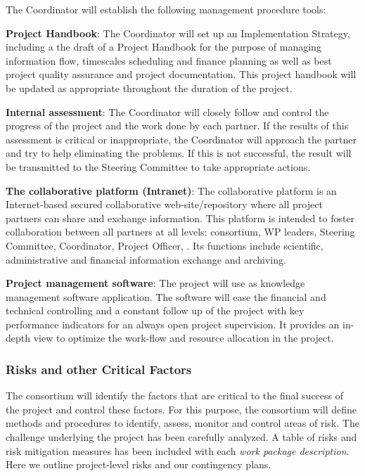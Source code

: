 The Coordinator will establish the following
management procedure tools:
\begin{denseItemize}

\item {\bf Project Handbook}: The Coordinator will set up an
  Implementation Strategy, including a the draft of a Project Handbook
  for the purpose of managing information flow, timescales scheduling
  and finance planning as well as best project quality assurance and
  project documentation. This project handbook will be updated as
  appropriate throughout the duration of the project.

\item {\bf Internal assessment}: The Coordinator will
  closely follow and control the progress of the project and the work
  done by each partner.  If the results of this assessment is critical
  or inappropriate, the Coordinator will approach the partner and try
  to help eliminating the problems. If this is not successful, the
  result will be transmitted to the Steering Committee to take
  appropriate actions.

\item {\bf The collaborative platform (Intranet)}: The collaborative
  platform is an Internet-based secured collaborative
  web-site/repository where all project partners can share and
  exchange information. This platform is intended to foster
  collaboration between all partners at all levels: consortium, WP leaders,
  Steering Committee, Coordinator, Project Officer, \etc. Its
  functions include scientific, administrative and financial
  information exchange and archiving. 

\item {\bf Project management software}: The project will use as
  knowledge management software application. The software will ease the financial and technical
  controlling and a constant follow up of the project with key
  performance indicators for an always open project supervision. It
  provides an in-depth view to optimize the work-flow and resource
  allocation in the project.
\end{denseItemize}



\subsubsection{Risks and other Critical Factors}
\label{sec:management:risks_crit_fac}

The consortium will identify the factors that are critical to the
final success of the project and control these factors. For this
purpose, the consortium will define methods and procedures to
identify, assess, monitor and control areas of risk. The challenge
underlying the project has been carefully analyzed. A table of risks
and risk mitigation measures has been included with each {\em work
  package description}. Here we outline project-level risks and our
contingency plans.

